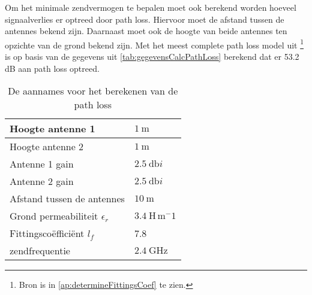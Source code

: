 Om het minimale zendvermogen te bepalen moet ook berekend worden hoeveel signaalverlies er optreed door path loss. Hiervoor moet de afstand tussen de antennes bekend zijn. Daarnaast moet ook de hoogte van beide antennes ten opzichte van de grond bekend zijn. Met het meest complete path loss model uit \cite{determineFittingsCoef}
\footnote{Bron \cite{determineFittingsCoef} is in \autoref{ap:determineFittingsCoef} te zien.} 
is op basis van de gegevens uit \autoref{tab:gegevensCalcPathLoss} berekend dat er 53.2 dB aan path loss optreed.
\begin{table}[ht]
    \centering
    \begin{tabular}{l|l}
        Hoogte antenne 1                    & $\qty{1  }{\meter}$               \\\hline
        Hoogte antenne 2                    & $\qty{1  }{\meter}$               \\\hline
        Antenne 1 gain                      & $\qty{2.5}{\decibel i}$           \\\hline
        Antenne 2 gain                      & $\qty{2.5}{\decibel i}$           \\\hline
        Afstand tussen de antennes          & $\qty{10 }{\meter}$               \\\hline
        Grond permeabiliteit $\epsilon_r$   & $\qty{3.4}{\henry\,\meter^-1}$    \\\hline
        Fittingscoëfficiënt $l_f$           & 7.8                               \\\hline
        zendfrequentie                      & $\qty{2.4}{\giga\hertz}$
    \end{tabular}
    \caption{De aannames voor het berekenen van de path loss}
    \label{tab:gegevensCalcPathLoss}
\end{table}

